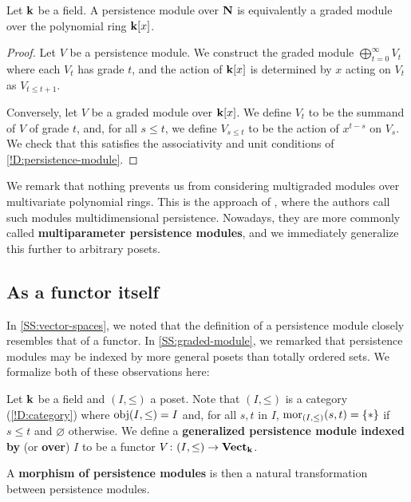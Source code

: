\begin{proposition}
  Let $\mathbf{k}$ be a field. A persistence module over $\mathbf{N}$ is equivalently a graded module over the polynomial ring $\mathbf{k}[x]$.
\end{proposition}

\begin{proof}
  Let $V$ be a persistence module. We construct the graded module $\bigoplus_{t = 0}^\infty V_t$ where each $V_t$ has grade $t$, and the action of $\mathbf{k}[x]$ is determined by $x$ acting on $V_t$ as $V_{t \leq t + 1}$.
  
  Conversely, let $V$ be a graded module over $\mathbf{k}[x]$. We define $V_t$ to be the summand of $V$ of grade $t$, and, for all $s \leq t$, we define $V_{s \leq t}$ to be the action of $x^{t - s}$ on $V_s$. We check that this satisfies the associativity and unit conditions of \cref{!D:persistence-module}.
\end{proof}

We remark that nothing prevents us from considering multigraded modules over multivariate polynomial rings. This is the approach of \cite{CarlssonZomorodian2009}, where the authors call such modules multidimensional persistence. Nowadays, they are more commonly called \textbf{multiparameter persistence modules}, and we immediately generalize this further to arbitrary posets.

\subsection{As a functor itself}
\label{SS:functor}

In \cref{SS:vector-spaces}, we noted that the definition of a persistence module closely resembles that of a functor. In \cref{SS:graded-module}, we remarked that persistence modules may be indexed by more general posets than totally ordered sets. We formalize both of these observations here:

\begin{definition}
  Let $\mathbf{k}$ be a field and $(I, \mathord{\leq})$ a poset. Note that $(I, \mathord{\leq})$ is a category (\cref{!D:category}) where $\operatorname{obj}(I, \mathord{\leq}) = I$ and, for all $s, t$ in $I$, $\operatorname{mor}_{(I, \mathord{\leq})}(s, t) = \{*\}$ if $s \leq t$ and $\varnothing$ otherwise. We define a \textbf{generalized persistence module indexed by} (or \textbf{over}) \textbf{$I$} to be a functor $V \colon (I, \mathord{\leq}) \to \operatorname{\mathbf{Vect}}_{\mathbf{k}}$.
  
  A \textbf{morphism of persistence modules} is then a natural transformation between persistence modules.
\end{definition}

